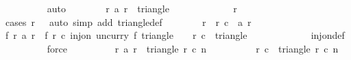 \begin{isabellebody}
\ \ \ \ \ \ \ \ \isamarkupfalse%
\ auto\isanewline
\ \ \ \ \ \ \isamarkupfalse%
\ {\isachardoublequoteopen}{\isacharparenleft}r{\isacharprime}{\isacharcomma}\ a\ r{\isacharprime}{\isacharparenright}\ {\isasymin}\ triangle\ {}\ {}\ {}{}{}{}{\isachardoublequoteclose}\isanewline
\ \ \ \ \ \ \ \ \isamarkupfalse%
\ {\isacharbackquoteopen}r{\isacharprime}\ {\isacharless}\ {}{}{}{}{\isacharbackquoteclose}\ {\isacharasterisk}{\isacharparenleft}{}{\isacharparenright}\ {\isacharasterisk}{\isacharparenleft}{}{\isacharparenright}\isanewline
\ \ \ \ \ \ \ \ \isamarkupfalse%
\ {\isacharparenleft}cases\ {\isachardoublequoteopen}r{\isacharprime}\ {\isacharequal}\ {}{\isachardoublequoteclose}{\isacharparenright}\ {\isacharparenleft}auto\ simp\ add{\isacharcolon}\ triangle{\isacharunderscore}def{\isacharparenright}\isanewline
\ \ \ \ \ \ \isamarkupfalse%
\ {\isachardoublequoteopen}r\ {\isacharequal}\ r{\isacharprime}{\isachardoublequoteclose}\ {\isachardoublequoteopen}c\ {\isacharequal}\ a\ r{\isacharprime}{\isachardoublequoteclose}\isanewline
\ \ \ \ \ \ \ \ \isamarkupfalse%
\ {\isacharbackquoteopen}f\ r{\isacharprime}\ {\isacharparenleft}a\ r{\isacharprime}{\isacharparenright}\ {\isacharequal}\ f\ r\ c{\isacharbackquoteclose}\ {\isacharbackquoteopen}inj{\isacharunderscore}on\ {\isacharparenleft}uncurry\ f{\isacharparenright}\ {\isacharparenleft}triangle\ {}\ {}\ {}{}{}{}{\isacharparenright}{\isacharbackquoteclose}\ {\isacharbackquoteopen}{\isacharparenleft}r{\isacharcomma}\ c{\isacharparenright}\ {\isasymin}\ triangle\ {}\ {}\ {}{}{}{}{\isacharbackquoteclose}\isanewline
\ \ \ \ \ \ \ \ \isamarkupfalse%
\ inj{\isacharunderscore}on{\isacharunderscore}def\isanewline
\ \ \ \ \ \ \ \ \isamarkupfalse%
\ force{\isacharplus}\isanewline
\isanewline
\ \ \ \ \ \ \isamarkupfalse%
\ \isamarkupfalse%
\ {\isachardoublequoteopen}{\isacharparenleft}r{\isacharprime}{\isacharcomma}\ a\ r{\isacharprime}{\isacharparenright}\ {\isasymin}\ triangle\ r{}\ c{}\ n{\isachardoublequoteclose}\isanewline
\ \ \ \ \ \ \ \ \isamarkupfalse%
\ {\isacharbackquoteopen}{\isacharparenleft}r{\isacharcomma}\ c{\isacharparenright}\ {\isasymin}\ triangle\ r{}\ c{}\ n{\isacharbackquoteclose}\isanewline

\end{isabellebody}
